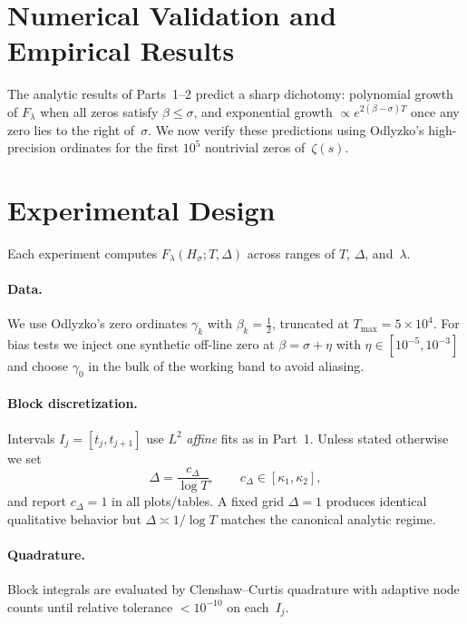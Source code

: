 
\section{Numerical Validation and Empirical Results}

The analytic results of Parts~1–2 predict a sharp dichotomy:
polynomial growth of $F_\lambda$ when all zeros satisfy $\beta\le\sigma$,
and exponential growth $\propto e^{2(\beta-\sigma)T}$ once any zero lies
to the right of~$\sigma$.  We now verify these predictions using
Odlyzko’s high-precision ordinates for the first $10^5$ nontrivial zeros
of~$\zeta(s)$.

\section{Experimental Design}

Each experiment computes $F_\lambda(H_\sigma;T,\Delta)$
across ranges of $T$, $\Delta$, and~$\lambda$.

\paragraph{Data.}
We use Odlyzko’s zero ordinates $\gamma_k$ with $\beta_k=\tfrac12$,
truncated at $T_{\max}=5\times10^4$.
For bias tests we inject one synthetic off-line zero at
$\beta=\sigma+\eta$ with $\eta\in[10^{-5},10^{-3}]$
and choose $\gamma_0$ in the bulk of the working band to avoid aliasing.

\paragraph{Block discretization.}
Intervals $I_j=[t_j,t_{j+1}]$ use $L^2$ \emph{affine} fits as in Part~1.
Unless stated otherwise we set
\[
\Delta=\frac{c_\Delta}{\log T},\qquad c_\Delta\in[\kappa_1,\kappa_2],
\]
and report $c_\Delta=1$ in all plots/tables.
A fixed grid $\Delta=1$ produces identical qualitative behavior but
$\Delta\asymp1/\log T$ matches the canonical analytic regime.

\paragraph{Quadrature.}
Block integrals are evaluated by Clenshaw–Curtis quadrature with adaptive
node counts until relative tolerance $<10^{-10}$ on each~$I_j$.

